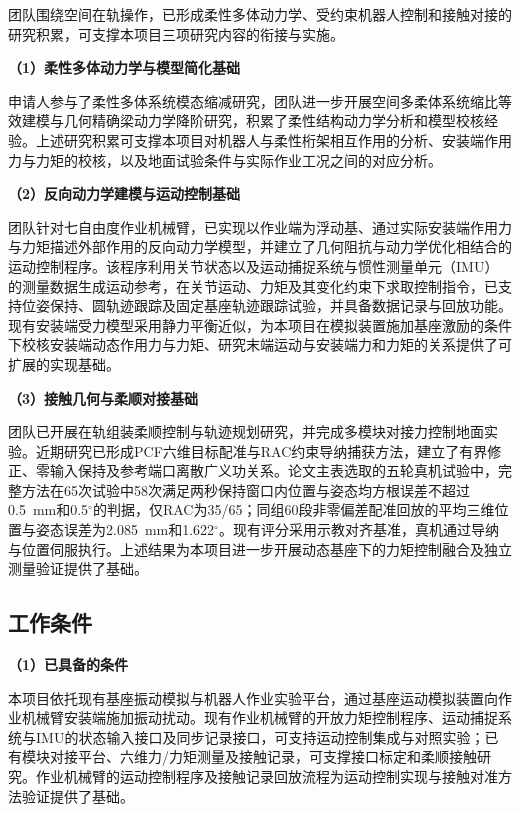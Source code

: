 \documentclass[UTF8,a4paper,zihao=-4,fontset=fandol]{ctexart}
\newcommand{\topic}[1]{\par\Needspace{4\baselineskip}\addvspace{0.5em}\noindent\textbf{#1}\par\nobreak}
\newcommand{\rev}[1]{{\color{red}#1}}
\begin{document}
团队围绕空间在轨操作，已形成柔性多体动力学、受约束机器人控制和接触对接的研究积累，可支撑本项目三项研究内容的衔接与实施。

\topic{（1）柔性多体动力学与模型简化基础}

申请人参与了柔性多体系统模态缩减研究\cite{sonneville2021}，团队进一步开展空间多柔体系统缩比等效建模\cite{qi2025}与几何精确梁动力学降阶研究，积累了柔性结构动力学分析和模型校核经验。上述研究积累可支撑本项目对机器人与柔性桁架相互作用的分析、安装端作用力与力矩的校核，以及地面试验条件与实际作业工况之间的对应分析。

\topic{（2）\rev{反向}动力学建模与运动控制基础}

团队针对七自由度作业机械臂，已实现以作业端为浮动基、通过实际安装端作用力与力矩描述外部作用的\rev{反向}动力学模型，并建立了几何阻抗与动力学优化相结合的运动控制程序。该程序利用关节状态以及运动捕捉系统与惯性测量单元（IMU）的测量数据生成运动参考，在关节运动、力矩及其变化约束下求取控制指令，已支持位姿保持、圆轨迹跟踪及固定基座轨迹跟踪试验，并具备数据记录与回放功能。现有安装端受力模型采用静力平衡近似，为本项目在模拟装置施加基座激励的条件下校核安装端动态作用力与力矩、研究末端运动与安装端力和力矩的关系提供了可扩展的实现基础。

\topic{（3）接触几何与柔顺对接基础}

团队已开展在轨组装柔顺控制与轨迹规划研究，并完成多模块对接力控制地面实验\cite{shi2024}。近期研究已形成PCF六维目标配准与RAC约束导纳捕获方法，建立了有界修正、零输入保持及参考端口离散广义功关系。论文主表选取的五轮真机试验中，完整方法在65次试验中58次满足两秒保持窗口内位置与姿态均方根误差不超过0.5~mm和0.5$^\circ$的判据，仅RAC为35/65；同组60段非零偏差配准回放的平均三维位置与姿态误差为2.085~mm和1.622$^\circ$。现有评分采用示教对齐基准，真机通过导纳与位置伺服执行。上述结果为本项目进一步开展动态基座下的力矩控制融合及独立测量验证提供了基础。

\subsection{工作条件}

\topic{（1）已具备的条件}

本项目依托现有基座振动模拟与机器人作业实验平台，通过基座运动模拟装置向作业机械臂安装端施加振动扰动。现有作业机械臂的开放力矩控制程序、运动捕捉系统与IMU的状态输入接口及同步记录接口，可支持运动控制集成与对照实验；已有模块对接平台、六维力/力矩测量及接触记录，可支撑接口标定和柔顺接触研究。作业机械臂的运动控制程序及接触记录回放流程为运动控制实现与接触对准方法验证提供了基础。
\end{document}
